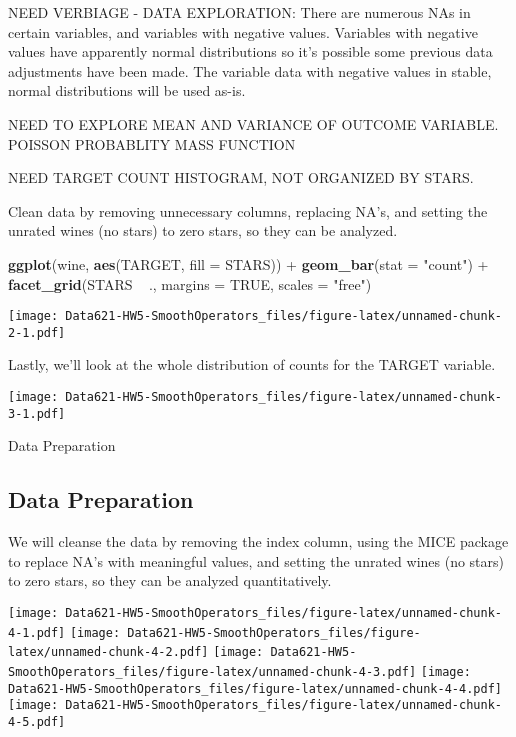 \documentclass[]{article}
\newenvironment{Shaded}{\begin{snugshade}}{\end{snugshade}}
\newcommand{\KeywordTok}[1]{\textcolor[rgb]{0.13,0.29,0.53}{\textbf{{#1}}}}
\newcommand{\DataTypeTok}[1]{\textcolor[rgb]{0.13,0.29,0.53}{{#1}}}
\newcommand{\StringTok}[1]{\textcolor[rgb]{0.31,0.60,0.02}{{#1}}}
\newcommand{\OtherTok}[1]{\textcolor[rgb]{0.56,0.35,0.01}{{#1}}}
\newcommand{\NormalTok}[1]{{#1}}
\begin{document}
NEED VERBIAGE - DATA EXPLORATION: There are numerous NAs in certain
variables, and variables with negative values. Variables with negative
values have apparently normal distributions so it's possible some
previous data adjustments have been made. The variable data with
negative values in stable, normal distributions will be used as-is.

NEED TO EXPLORE MEAN AND VARIANCE OF OUTCOME VARIABLE. POISSON
PROBABLITY MASS FUNCTION

NEED TARGET COUNT HISTOGRAM, NOT ORGANIZED BY STARS.

Clean data by removing unnecessary columns, replacing NA's, and setting
the unrated wines (no stars) to zero stars, so they can be analyzed.

\begin{Shaded}
\begin{Highlighting}[]
\KeywordTok{ggplot}\NormalTok{(wine, }\KeywordTok{aes}\NormalTok{(TARGET, }\DataTypeTok{fill =} \NormalTok{STARS)) +}\StringTok{ }\KeywordTok{geom_bar}\NormalTok{(}\DataTypeTok{stat =} \StringTok{"count"}\NormalTok{) +}\StringTok{ }\KeywordTok{facet_grid}\NormalTok{(STARS ~}\StringTok{ }
\StringTok{    }\NormalTok{., }\DataTypeTok{margins =} \OtherTok{TRUE}\NormalTok{, }\DataTypeTok{scales =} \StringTok{"free"}\NormalTok{)}
\end{Highlighting}
\end{Shaded}

\texttt{[image: Data621-HW5-SmoothOperators\_files/figure-latex/unnamed-chunk-2-1.pdf]}

Lastly, we'll look at the whole distribution of counts for the TARGET
variable.

\texttt{[image: Data621-HW5-SmoothOperators\_files/figure-latex/unnamed-chunk-3-1.pdf]}

\begin{center}
{\huge Data Preparation}
\end{center}

\subsection{Data Preparation}\label{data-preparation}

We will cleanse the data by removing the index column, using the MICE
package to replace NA's with meaningful values, and setting the unrated
wines (no stars) to zero stars, so they can be analyzed quantitatively.

\texttt{[image: Data621-HW5-SmoothOperators\_files/figure-latex/unnamed-chunk-4-1.pdf]}
\texttt{[image: Data621-HW5-SmoothOperators\_files/figure-latex/unnamed-chunk-4-2.pdf]}
\texttt{[image: Data621-HW5-SmoothOperators\_files/figure-latex/unnamed-chunk-4-3.pdf]}
\texttt{[image: Data621-HW5-SmoothOperators\_files/figure-latex/unnamed-chunk-4-4.pdf]}
\texttt{[image: Data621-HW5-SmoothOperators\_files/figure-latex/unnamed-chunk-4-5.pdf]}
\end{document}
